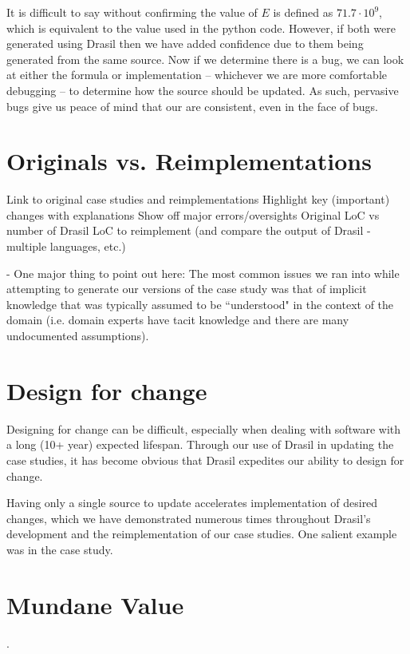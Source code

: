 It is difficult to say without confirming the value of $E$ is defined as 
$71.7\cdot{}10^{9}$, which is equivalent to the value used in the python code. 
However, if both \sfs{} were generated using Drasil then we have added 
confidence due to them being generated from the same source. Now if we 
determine there is a bug, we can look at either the formula or implementation 
-- whichever we are more comfortable debugging -- to determine how the source 
should be updated. As such, pervasive bugs give us peace of mind that our 
\sfs{} are consistent, even in the face of bugs.

\section{Originals vs. Reimplementations}
	Link to original case studies and reimplementations
	Highlight key (important) changes with explanations
	Show off major errors/oversights
	Original \sfs{} LoC vs number of Drasil LoC to reimplement (and compare the 
	output of Drasil - multiple languages, etc.)

- One major thing to point out here: The most common issues we ran into while 
attempting to generate our versions of the case study \sfs{} was that of 
implicit knowledge that was typically assumed to be ``understood" in the 
context of the domain (i.e. domain experts have tacit knowledge and there are 
many undocumented assumptions).

\section{Design for change}

Designing for change can be difficult, especially when dealing with software 
with a long (10+ year) expected lifespan. Through our use of Drasil in updating 
the case studies, it has become obvious that Drasil expedites our ability to 
design for change.

Having only a single source to update accelerates implementation of desired 
changes, which we have demonstrated numerous times throughout Drasil's 
development and the reimplementation of our case studies. One salient example 
was in the \gb{} case study.


\section {Mundane Value}
.

